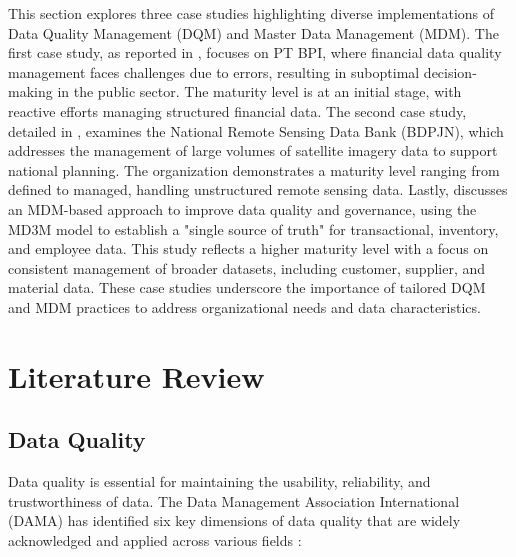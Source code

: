 \documentclass[conference]{IEEEtran}
\begin{document}
This section explores three case studies highlighting diverse implementations of Data Quality Management (DQM) and Master Data Management (MDM). The first case study, as reported in \cite{dqmBPI2022}, focuses on PT BPI, where financial data quality management faces challenges due to errors, resulting in suboptimal decision-making in the public sector. The maturity level is at an initial stage, with reactive efforts managing structured financial data. The second case study, detailed in \cite{payani2023}, examines the National Remote Sensing Data Bank (BDPJN), which addresses the management of large volumes of satellite imagery data to support national planning. The organization demonstrates a maturity level ranging from defined to managed, handling unstructured remote sensing data. Lastly, \cite{hikmawati2021} discusses an MDM-based approach to improve data quality and governance, using the MD3M model to establish a "single source of truth" for transactional, inventory, and employee data. This study reflects a higher maturity level with a focus on consistent management of broader datasets, including customer, supplier, and material data. These case studies underscore the importance of tailored DQM and MDM practices to address organizational needs and data characteristics.


\section{Literature Review}

\subsection{Data Quality}

Data quality is essential for maintaining the usability, reliability, and trustworthiness of data. The Data Management Association International (DAMA) has identified six key dimensions of data quality that are widely acknowledged \cite{DAMA_2013} and applied across various fields \cite{wahyudi2023data, kiran2024addressing, antonio2024data}:  
\end{document}

